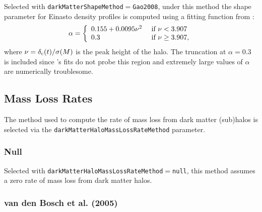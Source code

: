 Selected with {\tt darkMatterShapeMethod}$=${\tt Gao2008}, under this method the shape parameter for Einasto density profiles is computed using a fitting function from \cite{gao_redshift_2008}:
\begin{equation}
\alpha = \left\{ \begin{array}{ll} 0.155 + 0.0095\nu^2 & \hbox{ if } \nu < 3.907 \\ 0.3 & \hbox{ if } \nu \ge 3.907, \end{array} \right.
\end{equation}
where $\nu=\delta_{\rm c}(t)/\sigma(M)$ is the peak height of the halo. The truncation at $\alpha = 0.3$ is included since \cite{gao_redshift_2008}'s fits do not probe this region and extremely large values of $\alpha$ are numerically troublesome.

\subsection{Mass Loss Rates}

The method used to compute the rate of mass loss from dark matter (sub)halos is selected via the {\tt darkMatterHaloMassLossRateMethod} parameter.

\subsubsection{Null}

Selected with {\tt darkMatterHaloMassLossRateMethod}$=${\tt null}, this method assumes a zero rate of mass loss from dark matter halos.

\subsubsection{van den Bosch et al. (2005)}

